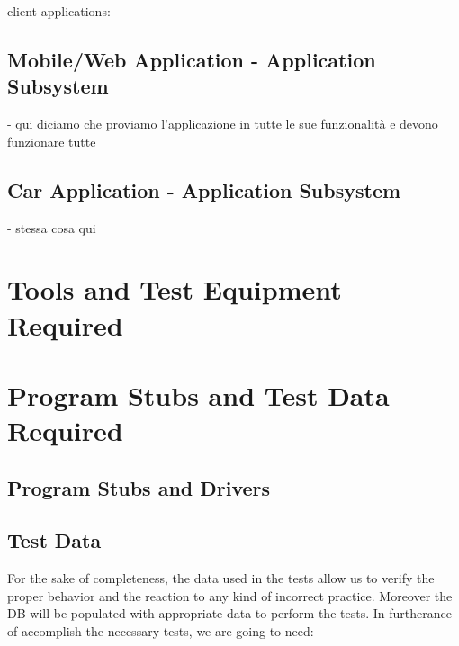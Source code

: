 \documentclass[english]{article}
\begin{document}
client applications:
\subsection{Mobile/Web Application - Application Subsystem}
- qui diciamo che proviamo l'applicazione in tutte le sue funzionalità e devono funzionare tutte

\subsection{Car Application - Application Subsystem}
- stessa cosa qui


\section{Tools and Test Equipment Required}

\section{Program Stubs and Test Data Required}

\subsection{Program Stubs and Drivers}

\subsection{Test Data}

For the sake of completeness, the data used in the tests allow us to verify the proper behavior and the reaction to any kind of incorrect practice. Moreover the DB will be populated with appropriate data to perform the tests.
In furtherance of accomplish the necessary tests, we are going to need:
\end{document}
